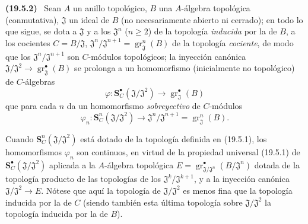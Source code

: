 \documentclass[10pt,oneside]{book}
\makeatletter
\newcommand{\gr}{\operatorname{gr}}
\newcommand{\setmanualcurrentlabel}[1]{\def\@currentlabel{#1}}
\newcommand{\oldpage}[2][]{%
  \setcounter{footnote}{0}%
  \marginpar{\scriptsize\textbf{#1}~|~#2}\ignorespaces}
\newenvironment{env}[1][]{\setmanualcurrentlabel{#1}\par\medskip\noindent\textbf{(#1)}\ }{\par}
\makeatother
\begin{document}
\begin{env}[19.5.2]
\label{0.19.5.2-es}
Sean $A$ un anillo topológico, $B$ una $A$-álgebra topológica
(conmutativa), $\mathfrak J$ un ideal de $B$ (no necesariamente abierto ni
cerrado); en todo lo que sigue, se dota a $\mathfrak J$ y a los
$\mathfrak J^n$ ($n\geq2$) de la topología \emph{inducida} por la de $B$,
a los cocientes $C=B/\mathfrak J$,
$\mathfrak J^n/\mathfrak J^{n+1}=\gr_{\mathfrak J}^n(B)$ de la topología
\emph{cociente}, de modo que los $\mathfrak J^n/\mathfrak J^{n+1}$ son
$C$-módulos topológicos; la inyección canónica
$\mathfrak J/\mathfrak J^2\to\gr_{\mathfrak J}^\bullet(B)$ se prolonga a un
homomorfismo (inicialmente no topológico) de $C$-álgebras
\[
  \varphi:\mathbf S_C^\bullet(\mathfrak J/\mathfrak J^2)
  \longrightarrow\gr_{\mathfrak J}^\bullet(B)
\]
que para cada $n$ da un homomorfismo \emph{sobreyectivo} de $C$-módulos
\begin{equation}
\label{0.19.5.2.1-es}
  \varphi_n:\mathbf S_C^n(\mathfrak J/\mathfrak J^2)
  \longrightarrow\mathfrak J^n/\mathfrak J^{n+1}
  =\gr_{\mathfrak J}^n(B).
  \tag{19.5.2.1}
\end{equation}

\oldpage[0\textsubscript{IV-1}]{91}

Cuando $\mathbf S_C^n(\mathfrak J/\mathfrak J^2)$ está dotado de la topología
definida en (19.5.1), los homomorfismos $\varphi_n$ son continuos, en virtud
de la propiedad universal (19.5.1) de
$\mathbf S_C^\bullet(\mathfrak J/\mathfrak J^2)$ aplicada a la $A$-álgebra
topológica $E=\gr^\bullet_{\mathfrak J/\mathfrak J^n}(B/\mathfrak J^n)$ dotada de la
topología producto de las topologías de los $\mathfrak J^k/\mathfrak J^{k+1}$, y a
la inyección canónica $\mathfrak J/\mathfrak J^2\to E$. Nótese que aquí la
topología de $\mathfrak J/\mathfrak J^2$ es menos fina que la topología
inducida por la de $C$ (siendo también esta última topología sobre
$\mathfrak J/\mathfrak J^2$ la topología inducida por la de $B$).
\end{env}
\end{document}
